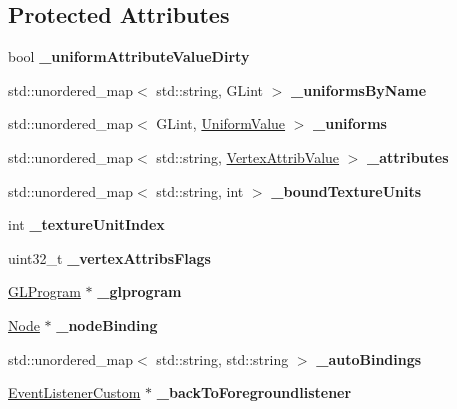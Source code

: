 \subsection*{Protected Attributes}
\begin{DoxyCompactItemize}
\item 
\mbox{\label{classGLProgramState_a8660b7b427ca3cb4d009555265cb394c}} 
bool {\bfseries \+\_\+uniform\+Attribute\+Value\+Dirty}
\item 
\mbox{\label{classGLProgramState_a3bf923141b407ac965c89e411996757c}} 
std\+::unordered\+\_\+map$<$ std\+::string, G\+Lint $>$ {\bfseries \+\_\+uniforms\+By\+Name}
\item 
\mbox{\label{classGLProgramState_a47bf64269d1d5a16e6de4cff27a5de79}} 
std\+::unordered\+\_\+map$<$ G\+Lint, \hyperlink{classUniformValue}{Uniform\+Value} $>$ {\bfseries \+\_\+uniforms}
\item 
\mbox{\label{classGLProgramState_a963b01dac69c0ea4bc4ade3a5938f522}} 
std\+::unordered\+\_\+map$<$ std\+::string, \hyperlink{classVertexAttribValue}{Vertex\+Attrib\+Value} $>$ {\bfseries \+\_\+attributes}
\item 
\mbox{\label{classGLProgramState_a9b6ad4b4791a5ffdea2b04151c2b1723}} 
std\+::unordered\+\_\+map$<$ std\+::string, int $>$ {\bfseries \+\_\+bound\+Texture\+Units}
\item 
\mbox{\label{classGLProgramState_a211665e3ef624cff003077616035a5ee}} 
int {\bfseries \+\_\+texture\+Unit\+Index}
\item 
\mbox{\label{classGLProgramState_adf9a39797c0d4a3b1f666f3aa29d9ebd}} 
uint32\+\_\+t {\bfseries \+\_\+vertex\+Attribs\+Flags}
\item 
\mbox{\label{classGLProgramState_a607c92beb9dc130bb0798b1ea10f3ab5}} 
\hyperlink{classGLProgram}{G\+L\+Program} $\ast$ {\bfseries \+\_\+glprogram}
\item 
\mbox{\label{classGLProgramState_ae2bfc9d48986e78f31bfaedd67cf9baf}} 
\hyperlink{classNode}{Node} $\ast$ {\bfseries \+\_\+node\+Binding}
\item 
\mbox{\label{classGLProgramState_a21b3659c08baae8a3fe1725d09a18825}} 
std\+::unordered\+\_\+map$<$ std\+::string, std\+::string $>$ {\bfseries \+\_\+auto\+Bindings}
\item 
\mbox{\label{classGLProgramState_aadb4a89860f3a6bbb46cd21bfe173fa8}} 
\hyperlink{classEventListenerCustom}{Event\+Listener\+Custom} $\ast$ {\bfseries \+\_\+back\+To\+Foregroundlistener}
\end{DoxyCompactItemize}
